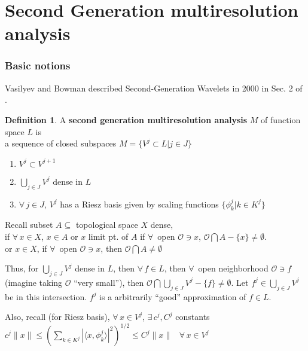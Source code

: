 \documentclass[twoside]{amsart}
\theoremstyle{plain}
\theoremstyle{definition}
\newtheorem{definition}{Definition}
\theoremstyle{remark}
\numberwithin{equation}{section}
\begin{document}
\part{Second Generation multiresolution analysis}

\section{Basic notions}

Vasilyev and Bowman described Second-Generation Wavelets in 2000 in Sec. 2 of \cite{OVasilyevCBowman2000}. 

\begin{definition}
  A \textbf{second generation multiresolution analysis} $M$ of function space $L$ is \\
a sequence of closed subspaces $M = \lbrace V^j \subset L | j \in J \rbrace$
\begin{enumerate}
  \item $V^j \subset V^{j+1}$
  \item $\bigcup_{j\in J} V^j $ dense in $L$ 
  \item $\forall \, j \in J$, $V^j$ has a Riesz basis given by scaling functions $\lbrace \phi^j_k | k \in K^j \rbrace$
\end{enumerate}
\end{definition}

Recall subset $A \subseteq $ topological space $X$ dense, \\
\phantom{ Recall } if $\forall \, x \in X$, $x\in A$ or $x$ limit pt. of $A$ if $\forall \, $ open $\mathcal{O} \ni x$, $\mathcal{O} \bigcap A - \lbrace x \rbrace \neq \emptyset$.  \\
\phantom{ Recall if } or $x\in X$, if $\forall \, $ open $\mathcal{O} \ni x$, then $\mathcal{O} \bigcap A \neq \emptyset$

Thus, for $\bigcup_{j\in J} V^j$ dense in $L$, then $\forall \, f \in L$, then $\forall \, $ open neighborhood $\mathcal{O} \ni f$ (imagine taking $\mathcal{O}$ ``very small''), then $\mathcal{O} \bigcap \bigcup_{j\in J}V^j - \lbrace f \rbrace \neq \emptyset$.  Let $f^j \in \bigcup_{j\in J} V^j$ be in this intersection.  $f^j$ is a arbitrarily ``good'' approximation of $f\in L$.  

Also, recall (for Riesz basis), $\forall \, x \in V^j$, $\exists \, c^j, C^j$ constants \\
$ c^j \| x \| \leq \left( \sum_{k \in K^j} | \langle x , \phi_k^j \rangle |^2 \right)^{1/2} \leq C^j \| x\| $ \, $\forall \, x \in V^j$
\end{document}
